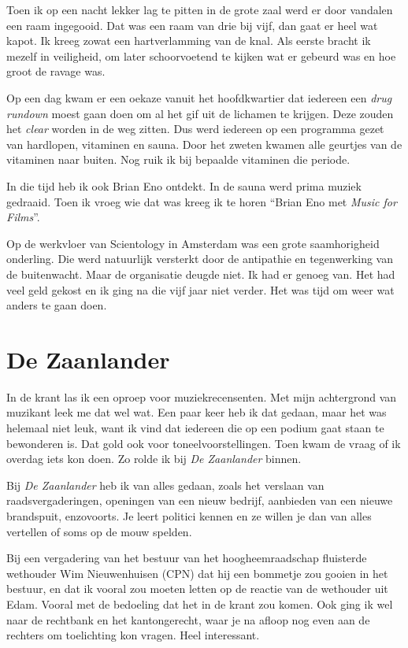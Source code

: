 \documentclass[12pt,twoside, openright]{memoir}
\begin{document}
Toen ik op een nacht lekker lag te pitten in de grote zaal werd er door vandalen een raam ingegooid. Dat was een raam van drie bij vijf, dan gaat er heel wat kapot. Ik kreeg zowat een hartverlamming van de knal. Als eerste bracht ik mezelf in veiligheid, om later schoorvoetend te kijken wat er gebeurd was en hoe groot de ravage was.

Op een dag kwam er een oekaze vanuit het hoofdkwartier dat iedereen een \emph{drug rundown} moest gaan doen om al het gif uit de lichamen te krijgen. Deze zouden het \emph{clear} worden in de weg zitten. Dus werd iedereen op een programma gezet van hardlopen, vitaminen en sauna. Door het zweten kwamen alle geurtjes van de vitaminen naar buiten. Nog ruik ik bij bepaalde vitaminen die periode. 

In die tijd heb ik ook Brian Eno ontdekt. In de sauna werd prima muziek gedraaid. Toen ik vroeg wie dat was kreeg ik te horen ``Brian Eno met \emph{Music for Films}''.

Op de werkvloer van Scientology in Amsterdam was een grote saamhorigheid onderling. Die werd natuurlijk versterkt door de antipathie en tegenwerking van de buitenwacht. Maar de organisatie deugde niet. Ik had er genoeg van. Het had veel geld gekost en ik ging na die vijf jaar niet verder. Het was tijd om weer wat anders te gaan doen.

\section*{De Zaanlander} %
\label{cha:zaanlander}

In de krant las ik een oproep voor muziekrecensenten. Met mijn achtergrond van muzikant leek me dat wel wat. Een paar keer heb ik dat gedaan, maar het was helemaal niet leuk, want ik vind dat iedereen die op een podium gaat staan te bewonderen is. Dat gold ook voor toneelvoorstellingen. Toen kwam de vraag of ik overdag iets kon doen. Zo rolde ik bij \emph{De Zaanlander} binnen. 

Bij \emph{De Zaanlander} heb ik van alles gedaan, zoals het verslaan van raadsvergaderingen, openingen van een nieuw bedrijf, aanbieden van een nieuwe brandspuit, enzovoorts. Je leert politici kennen en ze willen je dan van alles vertellen of soms op de mouw spelden. 

Bij een vergadering van het bestuur van het hoogheemraadschap fluisterde wethouder Wim Nieuwenhuisen (CPN) dat hij een bommetje zou gooien in het bestuur, en dat ik vooral zou moeten letten op de reactie van de wethouder uit Edam. Vooral met de bedoeling dat het in de krant zou komen. Ook ging ik wel naar de rechtbank en het kantongerecht, waar je na afloop nog even aan de rechters om toelichting kon vragen. Heel interessant. 
\end{document}
